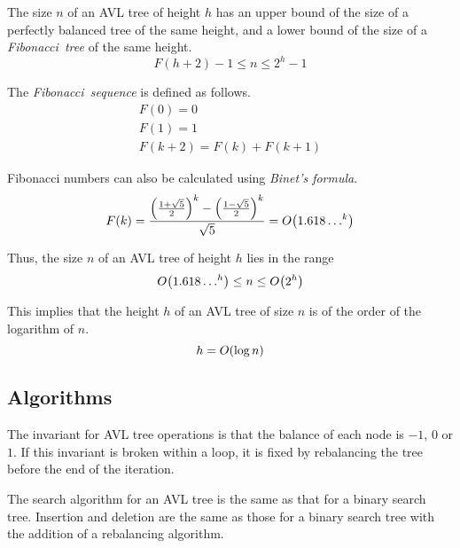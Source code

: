 The size \( n \) of an AVL tree of height \( h \) has an upper bound of the size of a perfectly balanced tree of the same height, and a lower bound of the size of a \emph{Fibonacci~tree} of the same height.
\begin{equation*}
  F\!\left( h + 2 \right) - 1 \leq n \leq 2^{h} - 1
\end{equation*}

The \emph{Fibonacci~sequence} is defined as follows.
\begin{gather*}
  F\!\left( 0 \right) = 0 \\
  F\!\left( 1 \right) = 1 \\
  F\!\left( k + 2 \right) = F\!\left( k \right) + F\!\left( k + 1 \right)
\end{gather*}

Fibonacci numbers can also be calculated using \emph{Binet's formula}.
\begin{equation*}
  F\!\left( k \right) = \frac{\left( \frac{1 + \sqrt{5}}{2} \right)^{k} - \left( \frac{1 - \sqrt{5}}{2} \right)^{k}}{\sqrt{5}} = O\!\left({1.618\ldots}^{k}\right)
\end{equation*}

Thus, the size \( n \) of an AVL tree of height \( h \) lies in the range
\begin{equation*}
  O\!\left({1.618\ldots}^{h}\right) \leq n \leq O\!\left(2^{h}\right)
\end{equation*}

This implies that the height \( h \) of an AVL tree of size \( n \) is of the order of the logarithm of \( n \).
\begin{equation*}
  h = O\!\left(\log n\right)
\end{equation*}

\subsection{Algorithms}

The invariant for AVL tree operations is that the balance of each node is \( -1 \), \( 0 \) or \( 1 \).
If this invariant is broken within a loop, it is fixed by rebalancing the tree before the end of the iteration.

The search algorithm for an AVL tree is the same as that for a binary search tree.
Insertion and deletion are the same as those for a binary search tree with the addition of a rebalancing algorithm.

